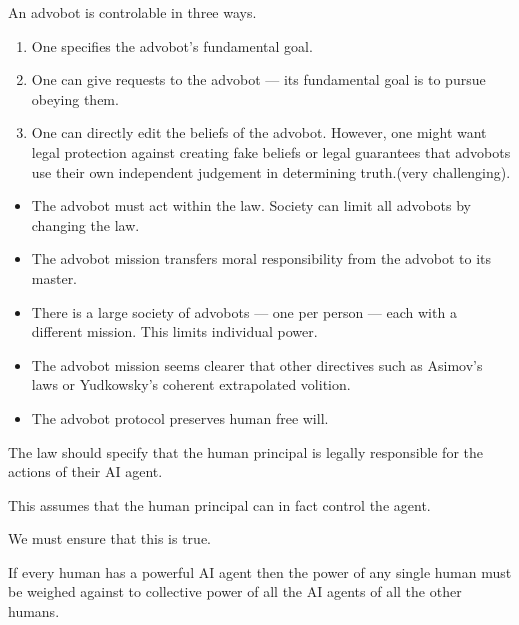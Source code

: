 {

An advobot is controlable in three ways.

\vfill
\begin{enumerate}
\item One specifies the advobot's fundamental goal.

\vfill
\item One can give requests to the advobot --- its fundamental goal is to pursue obeying them.

\vfill
\item One can directly edit the beliefs of the advobot.  However, one might want legal protection against creating fake beliefs or
legal guarantees that advobots use their own independent judgement in determining truth.(very challenging).
\end{enumerate}



\begin{itemize}
\item The advobot must act within the law. Society can limit all advobots by changing the law.

\vfill
\item The advobot mission transfers moral responsibility from the advobot to its master.

\vfill
\item There is a large society of advobots --- one per person --- each with a different mission.  This limits individual power.

\vfill
\item The advobot mission seems clearer that other directives such as Asimov’s laws or Yudkowsky's coherent extrapolated volition.

\vfill
\item The advobot protocol preserves human free will.
\end{itemize}


The law should specify that the human principal is legally responsible for the actions of their AI agent.

\vfill
This assumes that the human principal can in fact control the agent.

\vfill
We must ensure that this is true.


If every human has a powerful AI agent then the power of any single human must be weighed against to collective power of all the AI agents of all the other humans.

}
